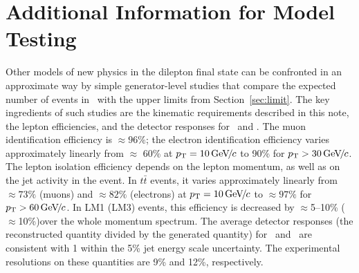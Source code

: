 \section{Additional Information for Model Testing}
\label{sec:outreach}

Other models of new physics in the dilepton final state can be confronted in an approximate way by simple 
generator-level studies that compare the expected number of events in \lumifinal\
with the upper limits from Section~\ref{sec:limit}.
The key ingredients of such studies are the kinematic requirements described 
in this note, the lepton efficiencies, and the detector responses for \HT\ and \MET.
%
The muon identification efficiency is $\approx 96\%$;
the electron identification efficiency varies approximately linearly from $\approx$ 60\% at 
$p_{\mathrm{T}} = 10{\,\text{Ge\hspace{-.08em}V\hspace{-0.16em}/\hspace{-0.08em}}c}$ to 90\% for $p_{\mathrm{T}} > 30{\,\text{Ge\hspace{-.08em}V\hspace{-0.16em}/\hspace{-0.08em}}c}$.  
%
The lepton isolation efficiency depends on the lepton momentum, as well as on the jet activity in the 
event.
In $t\bar{t}$ events, it varies approximately linearly from $\approx 73\%$ (muons)
and $\approx 82\%$ (electrons) at $p_{\mathrm{T}}=10{\,\text{Ge\hspace{-.08em}V\hspace{-0.16em}/\hspace{-0.08em}}c}$ to $\approx 97\%$ for $p_{\mathrm{T}}>60{\,\text{Ge\hspace{-.08em}V\hspace{-0.16em}/\hspace{-0.08em}}c}$. 
In LM1 (LM3) events, this efficiency is decreased by $\approx$5--10\% ($\approx$10\%)over the whole momentum spectrum.
%
The average detector responses (the reconstructed quantity divided by the generated quantity) 
for \HT\ and \MET\ are consistent with 1 within the 5\% jet energy scale uncertainty.
The experimental resolutions on these quantities are 9\% and 12\%, respectively.



